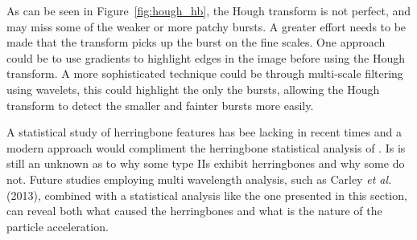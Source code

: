 As can be seen in Figure~\ref{fig:hough_hb}, the Hough transform is not perfect, and may miss some of the weaker or more patchy bursts. A greater effort needs to be made that the transform picks up the burst on the fine scales. One approach could be to use gradients to highlight edges in the image before using the Hough transform. A more sophisticated technique could be through multi-scale filtering using wavelets, this could highlight the only the bursts, allowing the Hough transform to detect the smaller and fainter bursts more easily.

A statistical study of herringbone features has bee lacking in recent times and a modern approach would compliment the herringbone statistical analysis of \citep{cairns1987, mann1995}. Is is still an unknown as to why some type IIs exhibit herringbones and why some do not. Future studies employing multi wavelength analysis, such as Carley {\it et al.}\,(2013), combined with a statistical analysis like the one presented in this section, can reveal both what caused the herringbones and what is the nature of the particle acceleration.



